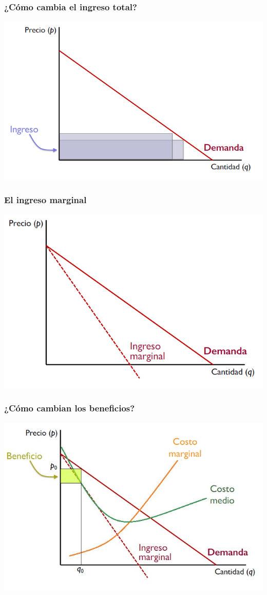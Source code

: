 \documentclass{beamer}
\begin{document}
\begin{frame}
\frametitle{¿Cómo cambia el ingreso total?}
\includegraphics[scale=0.6]{Figures/Tema_06.32_ingresototal3.png}
\end{frame}

\begin{frame}
\frametitle{ El ingreso marginal}
\includegraphics[scale=0.6]{Figures/Tema_06.33_ingresomarginal.png}
\end{frame}

\begin{frame}
\frametitle{ ¿Cómo cambian los beneficios?}
\includegraphics[scale=0.6]{Figures/Tema_06.34_beneficios.jpg}
\end{frame}
\end{document}
